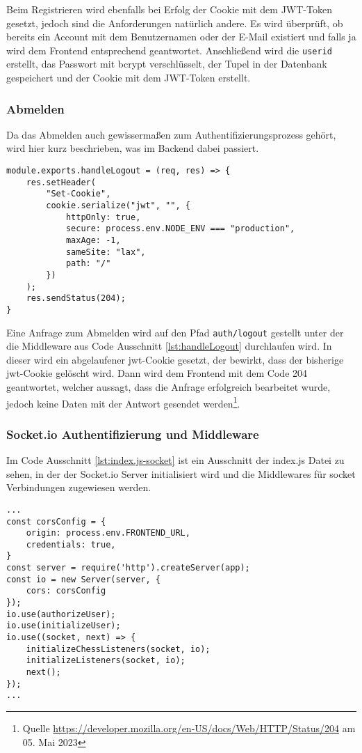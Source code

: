 Beim Registrieren wird ebenfalls bei Erfolg der Cookie mit dem JWT-Token gesetzt, jedoch sind die Anforderungen natürlich andere. Es wird überprüft, ob bereits ein Account mit dem Benutzernamen oder der E-Mail existiert und falls ja wird dem Frontend entsprechend geantwortet. Anschließend wird die \verb|userid| erstellt, das Passwort mit bcrypt verschlüsselt, der Tupel in der Datenbank gespeichert und der Cookie mit dem JWT-Token erstellt.

\subsubsection{Abmelden}
Da das Abmelden auch gewissermaßen zum Authentifizierungsprozess gehört, wird hier kurz beschrieben, was im Backend dabei passiert.

\begin{lstlisting}[style=codeStyle, caption={Middleware zum Abmelden}, label={lst:handleLogout}]
module.exports.handleLogout = (req, res) => {
    res.setHeader(
        "Set-Cookie",
        cookie.serialize("jwt", "", {
            httpOnly: true,
            secure: process.env.NODE_ENV === "production",
            maxAge: -1,
            sameSite: "lax",
            path: "/"
        })
    );
    res.sendStatus(204);
}
\end{lstlisting}

Eine Anfrage zum Abmelden wird auf den Pfad \verb|auth/logout| gestellt unter der die Middleware aus Code Ausschnitt \ref{lst:handleLogout} durchlaufen wird. In dieser wird ein abgelaufener \glqq jwt\grqq  -Cookie gesetzt, der bewirkt, dass der bisherige \glqq jwt\grqq -Cookie gelöscht wird. Dann wird dem Frontend mit dem Code 204 geantwortet, welcher aussagt, dass die Anfrage erfolgreich bearbeitet wurde, jedoch keine Daten mit der Antwort gesendet werden\footnote{Quelle \url{https://developer.mozilla.org/en-US/docs/Web/HTTP/Status/204} am 05. Mai 2023}.

\subsubsection{Socket.io Authentifizierung und Middleware}
\label{sec:Backend-Socket}
Im Code Ausschnitt \ref{lst:index.js-socket} ist ein Ausschnitt der index.js Datei zu sehen, in der der Socket.io Server initialisiert wird und die Middlewares für socket Verbindungen zugewiesen werden.

\begin{lstlisting}[style=codeStyle, caption={Ausschnitt der index.js Datei mit Socket.io Server Erstellung und Middleware Zuweisung}, label={lst:index.js-socket}]
...
const corsConfig = {
    origin: process.env.FRONTEND_URL,
    credentials: true,
}
const server = require('http').createServer(app);
const io = new Server(server, {
    cors: corsConfig
});
io.use(authorizeUser);
io.use(initializeUser);
io.use((socket, next) => {
    initializeChessListeners(socket, io);
    initializeListeners(socket, io);
    next();
});
...
\end{lstlisting}

